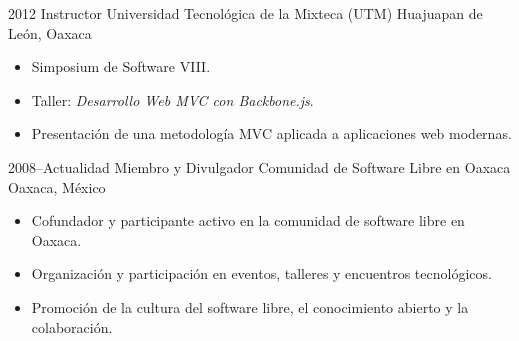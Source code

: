 \cventry
{2012}
{Instructor}
{Universidad Tecnológica de la Mixteca (UTM)}
{Huajuapan de León, Oaxaca}
{}
{
\begin{itemize}
  \item Simposium de Software VIII.
  \item Taller: \textit{Desarrollo Web MVC con Backbone.js}.
  \item Presentación de una metodología MVC aplicada a aplicaciones web modernas.
\end{itemize}
}


\cventry
{2008--Actualidad}
{Miembro y Divulgador}
{Comunidad de Software Libre en Oaxaca}
{Oaxaca, México}
{}
{
\begin{itemize}
  \item Cofundador y participante activo en la comunidad de software libre en Oaxaca.
  \item Organización y participación en eventos, talleres y encuentros tecnológicos.
  \item Promoción de la cultura del software libre, el conocimiento abierto y la colaboración.
\end{itemize}
}